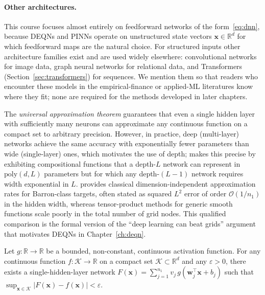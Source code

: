 \documentclass[11pt,a4paper]{report}
\newcommand{\x}{\bm{x}}
\newcommand{\w}{\bm{w}}
\newcommand{\R}{\mathbb{R}}
\begin{document}
\paragraph{Other architectures.}  This course focuses almost entirely on feedforward networks of the form~\eqref{eq:dnn}, because DEQNs and PINNs operate on unstructured state vectors $\x \in \R^d$ for which feedforward maps are the natural choice.  For structured inputs other architecture families exist and are used widely elsewhere: convolutional networks \citep[e.g.,][]{lecun2015deep} for image data, graph neural networks for relational data, and Transformers (Section~\ref{sec:transformers}) for sequences.  We mention them so that readers who encounter these models in the empirical-finance or applied-ML literatures know where they fit; none are required for the methods developed in later chapters.

The \emph{universal approximation theorem} \citep{cybenko1989approximation, hornik1989multilayer} guarantees that even a single hidden layer with sufficiently many neurons can approximate any continuous function on a compact set to arbitrary precision.  However, in practice, deep (multi-layer) networks achieve the same accuracy with exponentially fewer parameters than wide (single-layer) ones, which motivates the use of depth; \citet{telgarsky2016benefits} makes this precise by exhibiting compositional functions that a depth-$L$ network can represent in $\mathrm{poly}(d,L)$ parameters but for which any depth-$(L-1)$ network requires width exponential in $L$.  \citet{barron1993universal} provides classical dimension-independent approximation rates for Barron-class targets, often stated as squared $L^2$ error of order $\mathcal{O}(1/n_1)$ in the hidden width, whereas tensor-product methods for generic smooth functions scale poorly in the total number of grid nodes.  This qualified comparison is the formal version of the ``deep learning can beat grids'' argument that motivates DEQNs in Chapter~\ref{ch:deqn}.

\begin{definitionbox}
Let $g:\R\to\R$ be a bounded, non-constant, continuous activation function.  For any continuous function $f:\mathcal{K}\to\R$ on a compact set $\mathcal{K}\subset\R^d$ and any $\varepsilon>0$, there exists a single-hidden-layer network $F(\x) = \sum_{j=1}^{n_1} v_j\, g(\w_j^\top\x + b_j)$ such that $\sup_{\x\in\mathcal{K}} |F(\x) - f(\x)| < \varepsilon$.
\end{definitionbox}
\end{document}
